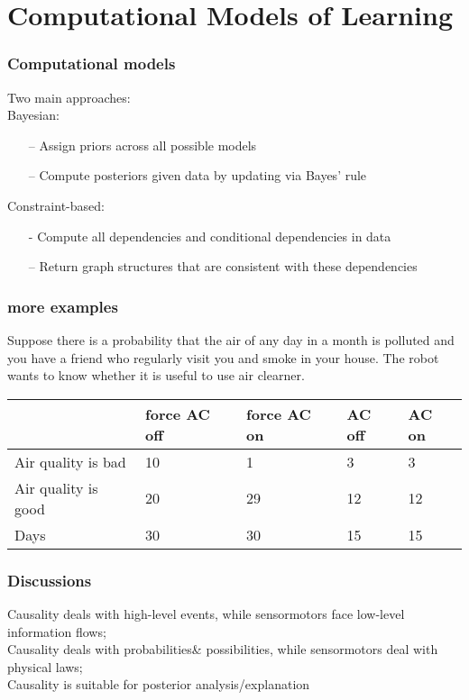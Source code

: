 \documentclass{beamer}
\begin{document}
\section{Computational Models of Learning}

\begin{frame} %
\frametitle{Computational models}
Two main approaches:\\
Bayesian:
\begin{itemize}
\item [–] Assign priors across all possible models
\item [–] Compute posteriors given data by updating via Bayes’ rule
\end{itemize}
Constraint-based:
\begin{itemize}
\item [-]Compute all dependencies and conditional dependencies in data
\item [–] Return graph structures that are consistent with these dependencies
\end{itemize}
\end{frame}


\begin{frame}
\frametitle{more examples}
Suppose there is a probability that the air of any day in a month is polluted
and you have a friend who regularly visit you and smoke in your house. The robot wants to know whether it is useful to use air clearner.


\begin{table}[htb]
\begin{tabularx}{\textwidth}{l l l l l}
\toprule
 & force AC off & force AC on & AC off & AC on\\
\midrule
Air quality is bad & 10 & 1 & 3 & 3 \\
Air quality is good & 20 & 29 & 12 & 12 \\
Days & 30 & 30 & 15 & 15 \\
\bottomrule
\end{tabularx}
\end{table}



\end{frame}

\begin{frame}
\frametitle{Discussions}
Causality deals with high-level events, while sensormotors face low-level information flows;\\
Causality deals with probabilities\& possibilities, while sensormotors deal with physical laws;\\
Causality is suitable for posterior analysis/explanation
\end{frame}
\end{document}
